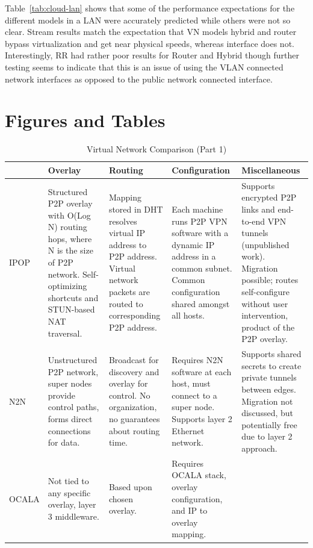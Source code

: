 Table~\ref{tab:cloud-lan} shows that some of the performance expectations
for the different models in a LAN were accurately predicted while others
were not so clear.  Stream results match the expectation that VN models hybrid
and router bypass virtualization and get near physical speeds, whereas interface
does not.  Interestingly, RR had rather poor results for Router and Hybrid
though further testing seems to indicate that this is an issue of using the
VLAN connected network interfaces as opposed to the public network connected
interface.

\section{Figures and Tables}

\begin{table}[ht]
\caption{Virtual Network Comparison (Part 1)}
\label{tab:virtual_networks}
{\small
\centering
\begin{tabular}{|p{.8in}||p{1.25in}|p{1.2in}|p{1.25in}|p{1.25in}|} \hline
& Overlay & Routing & Configuration & Miscellaneous \\ \hline\hline
IPOP
&
Structured P2P overlay with O(Log N) routing hops, where N is the size of P2P
network. Self-optimizing shortcuts and STUN-based NAT traversal.
&
Mapping stored in DHT resolves virtual IP address to P2P address. Virtual
network packets are routed to corresponding P2P address.
&
Each machine runs P2P VPN software with a dynamic IP address in a common subnet.
Common configuration shared amongst all hosts.
&
Supports encrypted P2P links and end-to-end VPN tunnels (unpublished work).
Migration possible; routes self-configure without user intervention, product of
the P2P overlay.
\\ \hline
N2N
&
Unstructured P2P network, super nodes provide control paths, forms direct
connections for data.
&
Broadcast for discovery and overlay for control.  No organization, no guarantees
about routing time.
&
Requires N2N software at each host, must connect to a super node.  Supports
layer 2 Ethernet network.
&
Supports shared secrets to create private tunnels between edges.  Migration not
discussed, but potentially free due to layer 2 approach.
\\ \hline
OCALA
&
Not tied to any specific overlay, layer 3 middleware.
&
Based upon chosen overlay.
&
Requires OCALA stack, overlay configuration, and IP to overlay mapping.

\end{tabular}}
\end{table}
